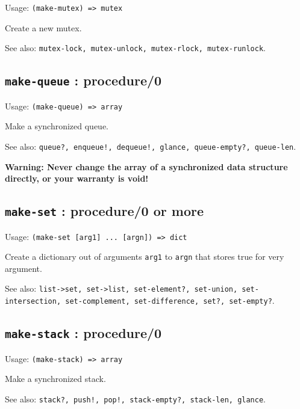 \documentclass[
]{article}
\newcommand{\passthrough}[1]{#1}
\begin{document}
Usage: \passthrough{\lstinline!(make-mutex) => mutex!}

Create a new mutex.

See also:
\passthrough{\lstinline!mutex-lock, mutex-unlock, mutex-rlock, mutex-runlock!}.

\hypertarget{make-queue-procedure0-1}{%
\subsection{\texorpdfstring{\texttt{make-queue} :
procedure/0}{make-queue : procedure/0}}\label{make-queue-procedure0-1}}

Usage: \passthrough{\lstinline!(make-queue) => array!}

Make a synchronized queue.

See also:
\passthrough{\lstinline"queue?, enqueue!, dequeue!, glance, queue-empty?, queue-len"}.

\textbf{Warning: Never change the array of a synchronized data structure
directly, or your warranty is void!}

\hypertarget{make-set-procedure0-or-more-1}{%
\subsection{\texorpdfstring{\texttt{make-set} : procedure/0 or
more}{make-set : procedure/0 or more}}\label{make-set-procedure0-or-more-1}}

Usage: \passthrough{\lstinline!(make-set [arg1] ... [argn]) => dict!}

Create a dictionary out of arguments \passthrough{\lstinline!arg1!} to
\passthrough{\lstinline!argn!} that stores true for very argument.

See also:
\passthrough{\lstinline!list->set, set->list, set-element?, set-union, set-intersection, set-complement, set-difference, set?, set-empty?!}.

\hypertarget{make-stack-procedure0-1}{%
\subsection{\texorpdfstring{\texttt{make-stack} :
procedure/0}{make-stack : procedure/0}}\label{make-stack-procedure0-1}}

Usage: \passthrough{\lstinline!(make-stack) => array!}

Make a synchronized stack.

See also:
\passthrough{\lstinline"stack?, push!, pop!, stack-empty?, stack-len, glance"}.
\end{document}
